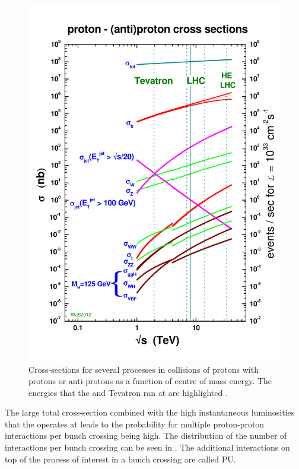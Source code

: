 \begin{figure}
  \includegraphics[width=1.2\largefigwidth]{plots/detector/crosssections2012HE_v4.pdf}
  \caption{Cross-sections for several processes in collisions of protons with protons or anti-protons as a function of centre of mass energy. The energies that the \LHC and Tevatron ran at are highlighted \cite{Stirlingppxs}.}
  \label{fig:xssummary}
\end{figure}

The large total cross-section combined with the high instantaneous luminosities that the \LHC operates at leads to the probability for multiple proton-proton interactions per bunch crossing being high. The distribution of the number of interactions per bunch crossing can be seen in . The additional interactions on top of the process of interest in a bunch crossing are called \ac{PU}.


